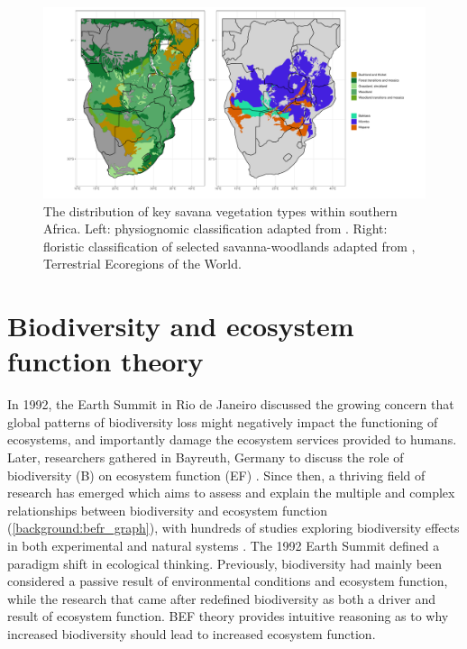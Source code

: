 \begin{refsection}
\begin{figure}[!htb]
\centering
	\includegraphics[width=\textwidth]{img/saf_map_both}
	\caption{The distribution of key savana vegetation types within southern Africa. Left: physiognomic classification adapted from \citet{White1983}. Right: floristic classification of selected savanna-woodlands adapted from \citet{Dinerstein2017}, Terrestrial Ecoregions of the World.}
	\label{background:saf_map}
\end{figure}

\section{Biodiversity and ecosystem function theory}
\label{background:sec:befr_theory}

In 1992, the Earth Summit in Rio de Janeiro discussed the growing concern that global patterns of biodiversity loss might negatively impact the functioning of ecosystems, and importantly damage the ecosystem services provided to humans. Later, researchers gathered in Bayreuth, Germany to discuss the role of biodiversity (B) on ecosystem function (EF) \citep{Schulze1993}. Since then, a thriving field of research has emerged which aims to assess and explain the multiple and complex relationships between biodiversity and ecosystem function (\autoref{background:befr_graph}), with hundreds of studies exploring biodiversity effects in both experimental and natural systems \citep{Plas2019, Newbold2016, Tilman2014}. The 1992 Earth Summit defined a paradigm shift in ecological thinking. Previously, biodiversity had mainly been considered a passive result of environmental conditions and ecosystem function, while the research that came after redefined biodiversity as both a driver and result of ecosystem function. BEF theory provides intuitive reasoning as to why increased biodiversity should lead to increased ecosystem function. 


\end{refsection}
